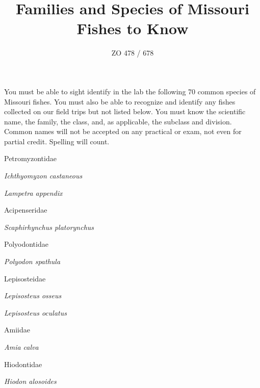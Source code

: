 \documentclass[11pt]{article}
\title{Families and Species of Missouri Fishes to Know}
\author{ZO 478 / 678}
\date{}                                           %
\begin{document}
\maketitle

You must be able to sight identify in the lab the following 70 common species of Missouri fishes.  You must also be able to recognize and identify any fishes collected on our field trips but not listed below.  You must know the scientific name, the family, the class, and, as applicable, the subclass and division.  Common names will not be accepted on any practical or exam, not even for 
partial credit.  Spelling will count.

\noindent\begin{multicols}{2}
Petromyzontidae\par
	\quad\textit{Ichthyomyzon castaneous}\par
	\quad\textit{Lampetra appendix}\par
\vspace{1ex}

Acipenseridae\par
	\quad\textit{Scaphirhynchus platorynchus}\par
\vspace{1ex}

Polyodontidae\par
	\quad\textit{Polyodon spathula}\par
\vspace{1ex}

Lepisosteidae\par
	\quad\textit{Lepisosteus osseus}\par
	\quad\textit{Lepisosteus oculatus}\par
\vspace{1ex}

Amiidae\par
	\quad\textit{Amia calva}\par
\vspace{1ex}

Hiodontidae\par
	\quad\textit{Hiodon alosoides}\par
\vspace{1ex}


\end{multicols}
\end{document}
